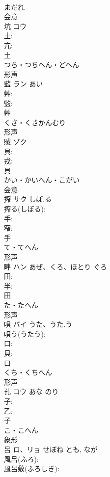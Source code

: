 \documentclass[8pt]{extreport}
\begin{document}
\begin{CJK}{UTF8}{min}
\\	まだれ	
\\	会意 
\\	坑	コウ			
\\	土: 
\\	亢: 
\\	土	
\\	つち・つちへん・どへん	
\\	形声 
\\	藍	ラン	あい		
\\	艸: 
\\	監: 
\\	艸	
\\	くさ・くさかんむり	
\\	形声 
\\	賊	ゾク			
\\	貝: 
\\	戎: 
\\	貝	
\\	かい・かいへん・こがい	
\\	会意 
\\	搾	サク	しぼ.る		
\\	搾る(しぼる): 
\\	手: 
\\	窄: 
\\	手	
\\	て・てへん	
\\	形声 
\\	畔	ハン	あぜ、くろ、ほとり	ぐろ	
\\	田: 
\\	半: 
\\	田	
\\	た・たへん	
\\	形声 
\\	唄	バイ	うた、うた.う		
\\	唄う(うたう): 
\\	口: 
\\	貝: 
\\	口	
\\	くち・くちへん	
\\	形声 
\\	孔	コウ	あな	のり	
\\	子: 
\\	乙: 
\\	子	
\\	こ・こへん	
\\	象形 
\\	呂	ロ、リョ	せぼね	とも, なが	
\\	風呂(ふろ): 
\\	風呂敷(ふろしき): 

\end{CJK}
\end{document}
